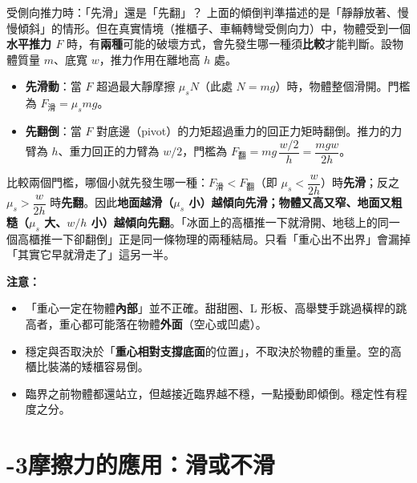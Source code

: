\documentclass[11pt]{article}
\begin{document}
\begin{補充框}{受側向推力時：「先滑」還是「先翻」？}
上面的傾倒判準描述的是「靜靜放著、慢慢傾斜」的情形。但在真實情境（推櫃子、車輛轉彎受側向力）中，物體受到一個\textbf{水平推力 $F$} 時，有\textbf{兩種}可能的破壞方式，會先發生哪一種須\textbf{比較}才能判斷。設物體質量 $m$、底寬 $w$，推力作用在離地高 $h$ 處。

\begin{itemize}\setlength{\itemsep}{1pt}
\item \textbf{先滑動}：當 $F$ 超過最大靜摩擦 $\mu_s N$（此處 $N=mg$）時，物體整個滑開。門檻為 $F_{\text{滑}}=\mu_s mg$。
\item \textbf{先翻倒}：當 $F$ 對底邊（pivot）的力矩超過重力的回正力矩時翻倒。推力的力臂為 $h$、重力回正的力臂為 $w/2$，門檻為 $F_{\text{翻}}=mg\,\dfrac{w/2}{h}=\dfrac{mgw}{2h}$。
\end{itemize}

比較兩個門檻，哪個小就先發生哪一種：$F_{\text{滑}}<F_{\text{翻}}$（即 $\mu_s<\dfrac{w}{2h}$）時\textbf{先滑}；反之 $\mu_s>\dfrac{w}{2h}$ 時\textbf{先翻}。因此\textbf{地面越滑（$\mu_s$ 小）越傾向先滑；物體又高又窄、地面又粗糙（$\mu_s$ 大、$w/h$ 小）越傾向先翻}。「冰面上的高櫃推一下就滑開、地毯上的同一個高櫃推一下卻翻倒」正是同一條物理的兩種結局。只看「重心出不出界」會漏掉「其實它早就滑走了」這另一半。
\end{補充框}


\textbf{注意：}
\begin{itemize}\setlength{\itemsep}{1pt}
\item 「重心一定在物體\textbf{內部}」並不正確。甜甜圈、L 形板、高舉雙手跳過橫桿的跳高者，重心都可能落在物體\textbf{外面}（空心或凹處）。
\item 穩定與否取決於「\textbf{重心相對支撐底面}的位置」，不取決於物體的重量。空的高櫃比裝滿的矮櫃容易倒。
\item 臨界之前物體都還站立，但越接近臨界越不穩，一點擾動即傾倒。穩定性有程度之分。
\end{itemize}

\section*{-3\quad 摩擦力的應用：滑或不滑}
\end{document}
